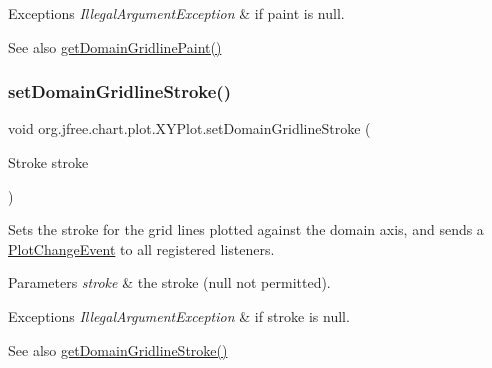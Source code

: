 \begin{DoxyExceptions}{Exceptions}
{\em Illegal\+Argument\+Exception} & if {\ttfamily paint} is {\ttfamily null}.\\
\hline
\end{DoxyExceptions}
\begin{DoxySeeAlso}{See also}
\mbox{\hyperlink{classorg_1_1jfree_1_1chart_1_1plot_1_1_x_y_plot_a95c888de7e6e6a42ea77151a3d993b2a}{get\+Domain\+Gridline\+Paint()}} 
\end{DoxySeeAlso}
\mbox{\label{classorg_1_1jfree_1_1chart_1_1plot_1_1_x_y_plot_ac779c1f825681fb1473651580225daf0}} 
\subsubsection{\texorpdfstring{set\+Domain\+Gridline\+Stroke()}{setDomainGridlineStroke()}}
{\footnotesize\ttfamily void org.\+jfree.\+chart.\+plot.\+X\+Y\+Plot.\+set\+Domain\+Gridline\+Stroke (\begin{DoxyParamCaption}\item[{Stroke}]{stroke }\end{DoxyParamCaption})}

Sets the stroke for the grid lines plotted against the domain axis, and sends a \mbox{\hyperlink{}{Plot\+Change\+Event}} to all registered listeners.


\begin{DoxyParams}{Parameters}
{\em stroke} & the stroke ({\ttfamily null} not permitted).\\
\hline
\end{DoxyParams}

\begin{DoxyExceptions}{Exceptions}
{\em Illegal\+Argument\+Exception} & if {\ttfamily stroke} is {\ttfamily null}.\\
\hline
\end{DoxyExceptions}
\begin{DoxySeeAlso}{See also}
\mbox{\hyperlink{classorg_1_1jfree_1_1chart_1_1plot_1_1_x_y_plot_a6aebe0dc593b268b8f16e8ca68795eae}{get\+Domain\+Gridline\+Stroke()}} 
\end{DoxySeeAlso}
\mbox{\label{classorg_1_1jfree_1_1chart_1_1plot_1_1_x_y_plot_aa7eee9b7aba042d305ebd83d927b8cb7}} 
